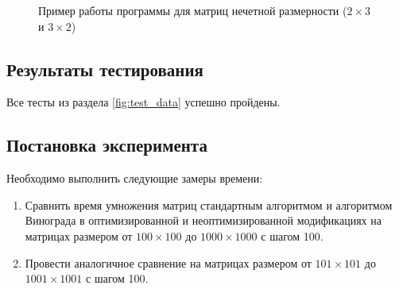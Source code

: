 \documentclass[a4paper,12pt]{article}
\begin{document}
               \begin{figure}[h!]
                \caption{Пример работы программы для матриц нечетной размерности ($2 \times 3$ и $3 \times 2$)}
                \label{fig:image_test_4}
            \end{figure}
            
    \pagebreak
	\newpage 
	\pagebreak
	\newpage 
            
    \subsection{Результаты тестирования}
    Все тесты из раздела \ref{fig:test_data} успешно пройдены.
    \subsection{Постановка эксперимента}
    
    Необходимо выполнить следующие замеры времени:
    \begin{enumerate} 
        \item Сравнить время умножения матриц стандартным алгоритмом и алгоритмом Винограда в оптимизированной и неоптимизированной модификациях на матрицах размером от $100 \times 100$ до $1000 \times 1000$ с шагом 100.
        \item Провести аналогичное сравнение на матрицах размером от $101 \times 101$ до $1001 \times 1001$ с шагом 100.
    \end{enumerate} 
    
\end{document}
